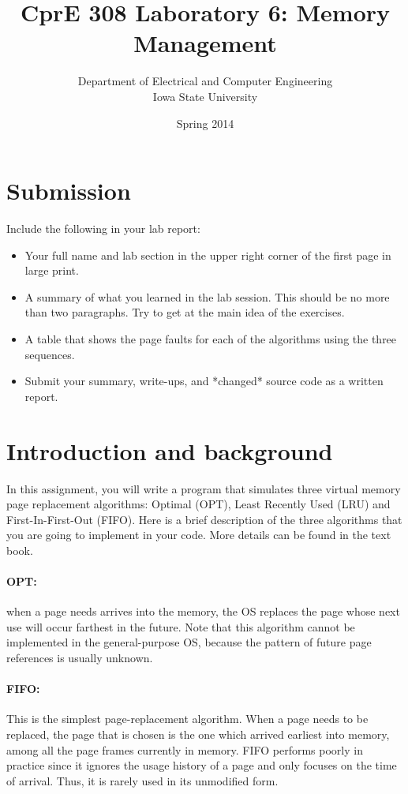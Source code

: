 \documentclass[letterpaper,10pt]{article}
\title{CprE 308 Laboratory 6: Memory Management}
\author{Department of Electrical and Computer Engineering \\ Iowa State University}
\date{Spring 2014}
\begin{document}
\maketitle
\section{Submission}
Include the following in your lab report:
\begin{itemize}
 \item Your full name and lab section in the upper right corner of the first page in large print.
 \item A summary of what you learned in the lab session. This should be no more than two
paragraphs. Try to get at the main idea of the exercises.
 \item A table that shows the page faults for each of the algorithms using the three sequences.
 \item Submit your summary, write-ups, and *changed* source code as a written report.
\end{itemize}


\section{Introduction and background}
In this assignment, you will write a program that simulates three virtual memory page
replacement algorithms: Optimal (OPT), Least Recently Used (LRU) and First-In-First-Out (FIFO).
Here is a brief description of the three algorithms that you are going to implement in your code.
More details can be found in the text book.

\paragraph{{\bf OPT}:} when a page needs arrives into the memory, the OS replaces the page whose next use will
occur farthest in the future. Note that this algorithm cannot be implemented in the general-purpose OS,
because the pattern of future page references is usually unknown.

\paragraph{{\bf FIFO}:} This is the simplest page-replacement algorithm. When a page needs to be replaced, the
page that is chosen is the one which arrived earliest into memory, among all the page frames
currently in memory. FIFO performs poorly in practice since it ignores the usage history of a
page and only focuses on the time of arrival. Thus, it is rarely used in its unmodified form.
\end{document}
